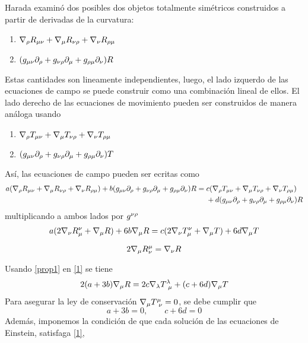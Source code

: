 Harada examinó dos posibles dos objetos totalmente simétricos construidos a partir de derivadas de la curvatura:
\begin{enumerate}
	\item $\nabla_\rho R_{\mu\nu }+\nabla_\mu  R_{\nu \rho  }+\nabla_\nu  R_{\rho \mu }$
	\item $(g_{\mu\nu }\partial_\rho +g_{\nu \rho  }\partial_\mu  +g_{\rho \mu }\partial_\nu )R $
\end{enumerate}
Estas cantidades son lineamente independientes, luego, el lado izquerdo de las ecuaciones de campo se puede construir como una combinación lineal de ellos. El lado derecho de las ecuaciones de movimiento pueden ser construidos de manera análoga usando
\begin{enumerate}
	\item $\nabla_\rho T_{\mu\nu }+\nabla_\mu  T_{\nu \rho  }+\nabla_\nu  T_{\rho \mu }$
	\item $(g_{\mu\nu }\partial_\rho +g_{\nu \rho  }\partial_\mu  +g_{\rho \mu }\partial_\nu )T $
\end{enumerate}
Así, las ecuaciones de campo pueden ser ecritas como
\begin{align*}
  a(\nabla_\rho R_{\mu\nu }+\nabla_\mu  R_{\nu \rho  }+\nabla_\nu  R_{\rho \mu })+b(g_{\mu\nu }\partial_\rho +g_{\nu \rho  }\partial_\mu  +g_{\rho \mu }\partial_\nu )R &=c(\nabla_\rho T_{\mu\nu }+\nabla_\mu  T_{\nu \rho  }+\nabla_\nu  T_{\rho \mu })\\
  &~~~~+d(g_{\mu\nu }\partial_\rho +g_{\nu \rho  }\partial_\mu  +g_{\rho \mu }\partial_\nu )R
\end{align*}
multiplicando a ambos lados por $g^{\nu\rho }$
\begin{align}\label{1}
  a(2\nabla_\nu R^\nu _\mu +\nabla_\mu R)+6b\nabla_\mu R=c(2\nabla_\nu T^\nu _\mu +\nabla_\mu T)+6d\nabla_\mu T
\end{align}
\begin{prop}
	\begin{equation}\label{prop1}
  2\nabla_\mu R^\mu _\nu =\nabla_\nu R
\end{equation}
\end{prop}
Usando \eqref{prop1} en \eqref{1} se tiene
\begin{equation}
  2(a +3b)\nabla_\mu R=2c\nabla_\lambda T^\lambda_{~\mu }+(c+6d)\nabla_\mu T
\end{equation}
Para asegurar la ley de conservación $\nabla_\mu T^\mu _{~\nu }=0$, se debe cumplir que
\begin{equation}
  a+3b=0,\qquad c+6d=0
\end{equation}
Además, imponemos la condición de que cada solución de las ecuaciones de Einstein, satisfaga \eqref{1},



